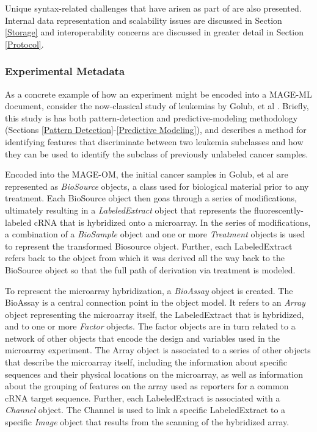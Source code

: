Unique syntax-related challenges that have arisen as part of \dbthesis are
also presented.  Internal data representation and scalability issues are
discussed in Section \ref{Storage} and interoperability concerns are discussed in
greater detail in Section \ref{Protocol}.

\subsubsection{Experimental Metadata}
\label{Experimental Metadata}

As a concrete example of how an experiment might be encoded into a MAGE-ML
document, consider the now-classical study of leukemias by Golub, et al
\cite{golub}.  Briefly, this study is has both pattern-detection and
predictive-modeling methodology (Sections \ref{Pattern
Detection}-\ref{Predictive Modeling}), and describes a method for identifying
features that discriminate between two leukemia subclasses and how they can be
used to identify the subclass of previously unlabeled cancer samples.

Encoded into the MAGE-OM, the initial cancer samples in Golub, et al
\cite{golub} are represented as \emph{BioSource} objects, a class used for
biological material prior to any treatment.  Each BioSource object then goas
through a series of modifications, ultimately resulting in a
\emph{LabeledExtract} object that represents the fluorescently-labeled cRNA
that is hybridized onto a microarray.  In the series of modifications, a
combination of a \emph{BioSample} object and one or more \emph{Treatment}
objects is used to represent the transformed Biosource object.  Further, each
LabeledExtract refers back to the object from which it was derived all the way
back to the BioSource object so that the full path of derivation via treatment
is modeled.

To represent the microarray hybridization, a \emph{BioAssay} object is created.
The BioAssay is a central connection point in the object model.  It refers to
an \emph{Array} object representing the microarray itself, the LabeledExtract
that is hybridized, and to one or more \emph{Factor} objects.  The factor
objects are in turn related to a network of other objects that encode the
design and variables used in the microarray experiment.  The Array object is
associated to a series of other objects that describe the microarray itself,
including the information about specific sequences and their physical locations
on the microarray, as well as information about the grouping of features on the
array used as reporters for a common cRNA target sequence.  Further, each
LabeledExtract is associated with a \emph{Channel} object.  The Channel is used
to link a specific LabeledExtract to a specific \emph{Image} object that
results from the scanning of the hybridized array.

